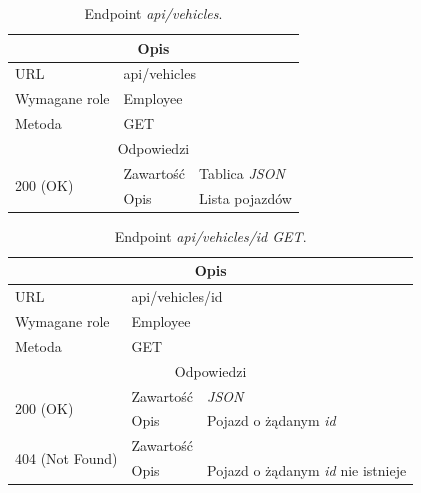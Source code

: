 \documentclass[eng,printmode,openany]{mgr}
\begin{document}
	\newpage
	\begin{table}[H]
		\caption{Endpoint \textit{api/vehicles}.}
		\begin{tabularx}{\textwidth}{|l|l|X|}
			\hline
			\multicolumn{3}{|c|}{Opis}
			\\ \hline
			URL                         & \multicolumn{2}{l|}{api/vehicles}
			\\ \hline
			Wymagane role               & \multicolumn{2}{l|}{Employee}
			\\ \hline
			Metoda                      & \multicolumn{2}{l|}{GET}
			\\ \hline
			\multicolumn{3}{|c|}{ Odpowiedzi}
			\\ \hline
			\multirow{2}{*}{200 (OK)}   & Zawartość         & Tablica \textit{JSON}
			\\ \cline{2-3}              & Opis         	    & Lista pojazdów
			\\ \hline
		\end{tabularx}
	\end{table}
	
	\begin{table}[H]
		\caption{Endpoint \textit{api/vehicles/id GET}.}
		\begin{tabularx}{\textwidth}{|l|l|X|}
			\hline
			\multicolumn{3}{|c|}{Opis}
			\\ \hline
			URL                         & \multicolumn{2}{l|}{api/vehicles/id}
			\\ \hline
			Wymagane role               & \multicolumn{2}{l|}{Employee}
			\\ \hline
			Metoda                      & \multicolumn{2}{l|}{GET}
			\\ \hline
			\multicolumn{3}{|c|}{Odpowiedzi}
			\\ \hline
			\multirow{2}{*}{200 (OK)} 	        & Zawartość   	& \textit{JSON}
			\\ \cline{2-3}                      & Opis         	& Pojazd o żądanym \textit{id}
			\\ \hline
			\multirow{2}{*}{404 (Not Found)} 	& Zawartość     & 
			\\ \cline{2-3}                      & Opis          & Pojazd o żądanym \textit{id} nie istnieje
			\\ \hline
		\end{tabularx}
	\end{table}
	
\end{document}
